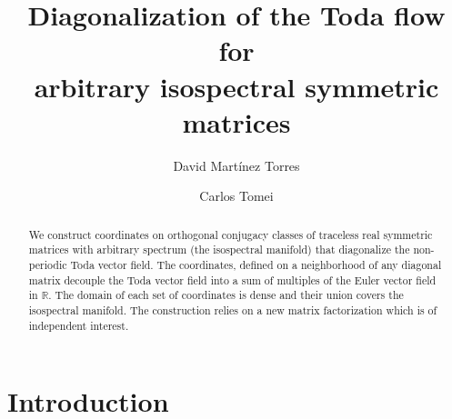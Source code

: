 \documentclass[reqno]{amsart}
\title[Diagonalization of the Toda flow]{Diagonalization of the Toda flow  for \\ arbitrary isospectral symmetric matrices}
\author{David Mart\'inez Torres}
\author{Carlos Tomei}
\newcommand{\R}{\mathbb{R}}
\theoremstyle{definition} %
\begin{document}
\begin{abstract} We construct  coordinates on orthogonal conjugacy classes of traceless real symmetric  matrices with arbitrary spectrum  (the isospectral manifold) that diagonalize the non-periodic Toda vector field. The coordinates, defined on a neighborhood of any diagonal matrix decouple the Toda vector field into a sum of multiples of the Euler vector field in $\R$. The domain of each set of coordinates is dense and  their union covers the isospectral manifold.  The construction relies on a new matrix factorization  which is of independent interest.
 \end{abstract}
\maketitle

\section{Introduction}
\end{document}
